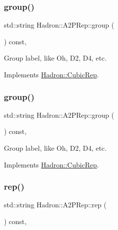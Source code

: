 \subsubsection{\texorpdfstring{group()}{group()}\hspace{0.1cm}{\footnotesize\ttfamily [2/3]}}
{\footnotesize\ttfamily std\+::string Hadron\+::\+A2\+P\+Rep\+::group (\begin{DoxyParamCaption}{ }\end{DoxyParamCaption}) const\hspace{0.3cm}{\ttfamily [inline]}, {\ttfamily [virtual]}}

Group label, like Oh, D2, D4, etc. 

Implements \mbox{\hyperlink{structHadron_1_1CubicRep_a0748f11ec87f387062c8e8981339a29c}{Hadron\+::\+Cubic\+Rep}}.

\mbox{\label{structHadron_1_1A2PRep_accbc36395d6c73bf53f8914b3219f902}} 
\subsubsection{\texorpdfstring{group()}{group()}\hspace{0.1cm}{\footnotesize\ttfamily [3/3]}}
{\footnotesize\ttfamily std\+::string Hadron\+::\+A2\+P\+Rep\+::group (\begin{DoxyParamCaption}{ }\end{DoxyParamCaption}) const\hspace{0.3cm}{\ttfamily [inline]}, {\ttfamily [virtual]}}

Group label, like Oh, D2, D4, etc. 

Implements \mbox{\hyperlink{structHadron_1_1CubicRep_a0748f11ec87f387062c8e8981339a29c}{Hadron\+::\+Cubic\+Rep}}.

\mbox{\label{structHadron_1_1A2PRep_aa2ba2d1bc832b1d1fdba1befcfe8a256}} 
\subsubsection{\texorpdfstring{rep()}{rep()}\hspace{0.1cm}{\footnotesize\ttfamily [1/3]}}
{\footnotesize\ttfamily std\+::string Hadron\+::\+A2\+P\+Rep\+::rep (\begin{DoxyParamCaption}{ }\end{DoxyParamCaption}) const\hspace{0.3cm}{\ttfamily [inline]}, {\ttfamily [virtual]}}

